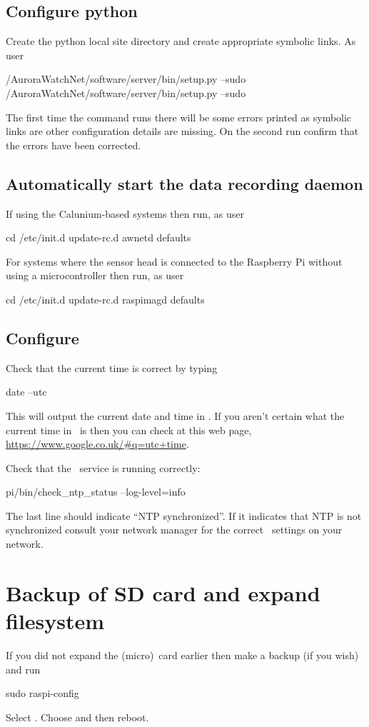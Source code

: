 \subsection{Configure python}

Create the python local site directory and create appropriate symbolic
links. As user \piUser
\begin{Cmd}
\mytilde/AuroraWatchNet/software/server/bin/setup.py --sudo
\mytilde/AuroraWatchNet/software/server/bin/setup.py --sudo
\end{Cmd}

The first time the command runs there will be some errors printed as
symbolic links are other configuration details are missing. On the
second run confirm that the errors have been corrected.

\subsection{Automatically start the data recording daemon}
If using the Calunium-based systems then run, as user \rootUser
\begin{Cmd}
cd /etc/init.d
update-rc.d awnetd defaults
\end{Cmd}

For systems where the sensor head is connected to the Raspberry Pi
without using a microcontroller then run, as user \rootUser
\begin{Cmd}
cd /etc/init.d
update-rc.d raspimagd defaults
\end{Cmd}

\subsection{Configure \protect{}}
Check that the current time is correct by typing
\begin{Cmd}
date --utc
\end{Cmd}
This will output the current date and time in \utc. If you aren't
certain what the current time in \utc\ is then you can check at this
web page, \url{https://www.google.co.uk/#q=utc+time}.

Check that the \ntp\ service is running correctly:
\begin{Cmd}
\mytilde{}pi/bin/check_ntp_status --log-level=info
\end{Cmd}
The last line should indicate ``NTP synchronized''. If it indicates
that NTP is not synchronized consult your network manager for the
correct \ntp\ settings on your network.



\section{Backup of SD card and expand filesystem}

If you did not expand the (micro)\sd\ card earlier then make a backup
(if you wish) and run
\begin{Cmd}
sudo raspi-config
\end{Cmd}
Select . Choose  and then reboot.
